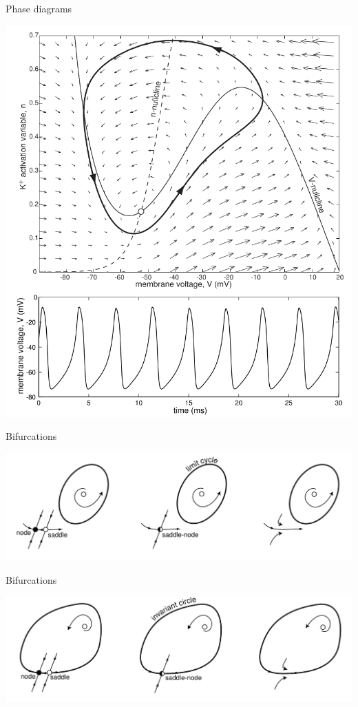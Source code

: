 \documentclass[aspectratio=169]{beamer}
\begin{document}
\begin{frame}[plain,label={sec:org0951dc1}]{Phase diagrams}
\begin{center}
\includegraphics[height=\textheight]{./phaseplane.png}
\end{center}
\end{frame}

\begin{frame}[label={sec:org0651f9c}]{Bifurcations}
\begin{center}
\includegraphics[width=.9\linewidth]{./saddlenode.png}
\end{center}
\end{frame}

\begin{frame}[label={sec:org56d9c8d}]{Bifurcations}
\begin{center}
\includegraphics[width=.9\linewidth]{./snic.png}
\end{center}
\end{frame}
\end{document}
